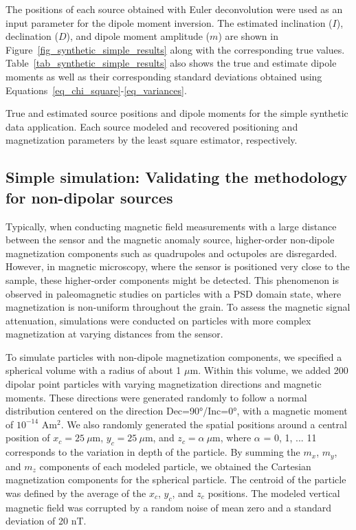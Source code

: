 The positions of each source obtained with Euler deconvolution were used as an input parameter for the dipole moment inversion.
The estimated inclination ($I$), declination ($D$), and dipole moment amplitude ($m$) are shown in Figure~\ref{fig_synthetic_simple_results} along with the corresponding true values.
Table~\ref{tab_synthetic_simple_results} also shows the true and estimate dipole moments as well as their corresponding standard deviations obtained using Equations~\ref{eq_chi_square}-\ref{eq_variances}.

\begin{table}[tb]
  \begin{center}
    \small
    
  \end{center}
  \caption{
  True and estimated source positions and dipole moments for the simple synthetic data application.
  Each source modeled and recovered positioning and magnetization parameters by the least square estimator, respectively.}
  \label{tab_synthetic_simple_results}
\end{table}


\subsection{Simple simulation: Validating the methodology for non-dipolar sources}

Typically, when conducting magnetic field measurements with a large distance between the sensor and the magnetic anomaly source, higher-order non-dipole magnetization components such as quadrupoles and octupoles are disregarded. However, in magnetic microscopy, where the sensor is positioned very close to the sample, these higher-order components might be detected. This phenomenon is observed in paleomagnetic studies on particles with a PSD domain state, where magnetization is non-uniform throughout the grain. To assess the magnetic signal attenuation, simulations were conducted on particles with more complex magnetization at varying distances from the sensor.

To simulate particles with non-dipole magnetization components, we specified a spherical volume with a radius of about 1 $\mu$m. Within this volume, we added 200 dipolar point particles with varying magnetization directions and magnetic moments. These directions were generated randomly to follow a normal distribution centered on the direction Dec=90°/Inc=0°, with a magnetic moment of $10^{-14}$ Am$^2$. We also randomly generated the spatial positions around a central position of $x_c=25~\mu$m, $y_c=25~\mu$m, and $z_c=\alpha~\mu$m, where $\alpha$ = 0, 1, ... 11 corresponds to the variation in depth of the particle. By summing the $m_x$, $m_y$, and $m_z$ components of each modeled particle, we obtained the Cartesian magnetization components for the spherical particle. The centroid of the particle was defined by the average of the $x_c$, $y_c$, and $z_c$ positions. The modeled vertical magnetic field was corrupted by a random noise of mean zero and a standard deviation of 20 nT.

